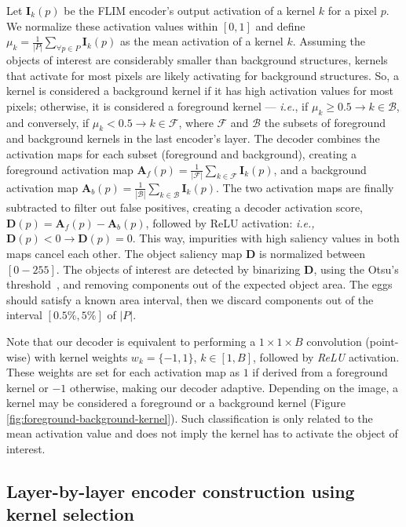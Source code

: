 \documentclass[times,twocolumn,final,authoryear]{elsarticle}
\begin{document}
      Let $\textbf{I}_k(p)$ be the FLIM encoder's output activation of a kernel $k$ for a pixel $p$. We  normalize these activation values within $[0,1]$ and define $\mu_k = \frac{1}{|P|} \sum\limits_{\forall p \in P}{\textbf{I}_k(p)}$ as the mean activation of a kernel $k$. Assuming the objects of interest are considerably smaller than background structures, kernels that activate for most pixels are likely activating for background structures. So, a kernel is considered a background kernel if it has high activation values for most pixels; otherwise, it is considered a foreground kernel --- \textit{i.e.}, if $\mu_k \geq 0.5 \rightarrow k \in \mathcal{B}$, and conversely, if $\mu_k < 0.5 \rightarrow k \in \mathcal{F}$, where  $\mathcal{F}$ and $\mathcal{B}$ the subsets of foreground and background kernels in the last encoder's layer. The decoder combines the activation maps for each subset (foreground and background), creating a foreground activation map $\textbf{A}_f(p) = \frac{1}{|\mathcal{F}|}\sum\limits_{k \in \mathcal{F}}{\textbf{I}_k(p)}$, and a background activation map $\textbf{A}_b(p) = \frac{1}{|\mathcal{B}|}\sum\limits_{k \in \mathcal{B}}{\textbf{I}_k(p)}$. The two activation maps are finally subtracted to filter out false positives, creating a decoder activation score,  $\textbf{D}(p) = \textbf{A}_f(p) - \textbf{A}_b(p)$, followed by ReLU activation: \textit{i.e.,} $\textbf{D}(p) < 0 \rightarrow \textbf{D}(p) = 0$. This way, impurities with high saliency values in both maps cancel each other. The object saliency map \textbf{D} is normalized between $[0-255]$. The objects of interest are detected by binarizing \textbf{D}, using the Otsu's threshold~\cite{otsu1979threshold}, and removing components out of the expected object area. The eggs should satisfy a known area interval, then we discard components out of the interval $[0.5\%,5\%]$ of $|P|$.
    
    Note that our decoder is equivalent to performing a $1 \times 1 \times B$ convolution (point-wise) with kernel weights $w_k = \{-1, 1\}$, $k\in [1,B]$, followed by \textit{ReLU} activation. These weights are set for each activation map as $1$ if derived from a foreground kernel or $-1$ otherwise, making our decoder adaptive. Depending on the image, a kernel may be considered a foreground or a background kernel (Figure \ref{fig:foreground-background-kernel}). Such classification is only related to the mean activation value and does not imply the kernel has to activate the object of interest.


\subsection{Layer-by-layer encoder construction using kernel selection}
   
\end{document}
